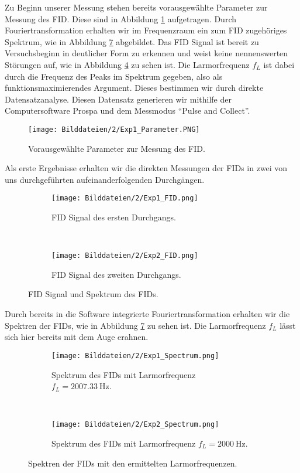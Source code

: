\documentclass[../../main.tex]{subfiles}
\begin{document}
    Zu Beginn unserer Messung stehen bereits vorausgewählte Parameter zur Messung des FID. Diese sind in Abbildung \ref{fig:2:Parameter} aufgetragen. Durch Fouriertransformation erhalten wir im Frequenzraum ein zum FID zugehöriges Spektrum, wie in Abbildung \ref{fig:2:Spectrum} abgebildet. Das FID Signal ist bereit zu Versuchsbeginn in deutlicher Form zu erkennen und weist keine nennenswerten Störungen auf, wie in Abbildung \ref{fig:2:FID12} zu sehen ist. Die Larmorfrequenz $f_L$ ist dabei durch die Frequenz des Peaks im Spektrum gegeben, also als funktionsmaximierendes Argument. Dieses bestimmen wir durch direkte Datensatzanalyse. Diesen Datensatz generieren wir mithilfe der Computersoftware Prospa und dem Messmodus \enquote{Pulse and Collect}. 
    \begin{figure}[H]
        \centering
        \texttt{[image: Bilddateien/2/Exp1\_Parameter.PNG]}
        \caption{Vorausgewählte Parameter zur Messung des FID.}
        \label{fig:2:Parameter}
    \end{figure}
    Als erste Ergebnisse erhalten wir die direkten Messungen der FIDs in zwei von uns durchgeführten aufeinanderfolgenden Durchgängen.
    \begin{figure}[H]
        \centering
        \begin{subfigure}[b]{0.4\textwidth}
            \texttt{[image: Bilddateien/2/Exp1\_FID.png]}
            \caption{FID Signal des ersten Durchgangs.}
            \label{fig:2:FID1}
        \end{subfigure}
        \
        \begin{subfigure}[b]{0.4\textwidth}
            \texttt{[image: Bilddateien/2/Exp2\_FID.png]}
            \caption{FID Signal des zweiten Durchgangs.}
            \label{fig:2:FID2}
        \end{subfigure}
        \caption{FID Signal und Spektrum des FIDs.}
        \label{fig:2:FID12}
    \end{figure}
    Durch bereits in die Software integrierte Fouriertransformation erhalten wir die Spektren der FIDs, wie in Abbildung \ref{fig:2:Spectrum} zu sehen ist. Die Larmorfrequenz $f_L$ lässt sich hier bereits mit dem Auge erahnen.
    \begin{figure}[H]
        \centering
        \begin{subfigure}[b]{0.4\textwidth}
            \texttt{[image: Bilddateien/2/Exp1\_Spectrum.png]}
            \caption{Spektrum des FIDs mit Larmorfrequenz $f_L = \SI{2007.33}{\hertz}$.}
            \label{fig:2:Spectrum-1}
        \end{subfigure}
        \
        \begin{subfigure}[b]{0.4\textwidth}
            \texttt{[image: Bilddateien/2/Exp2\_Spectrum.png]}
            \caption{Spektrum des FIDs mit Larmorfrequenz $f_L = \SI{2000}{\hertz}$.}
            \label{fig:2:Spectrum-2}
        \end{subfigure}
        \caption{Spektren der FIDs mit den ermittelten Larmorfrequenzen.}
        \label{fig:2:Spectrum}
    \end{figure}
\end{document}
